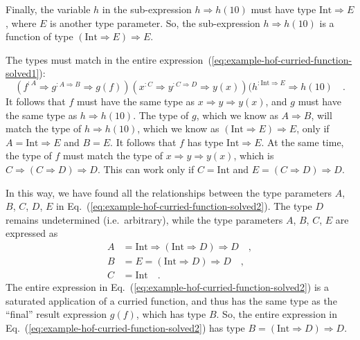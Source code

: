 Finally, the variable $h$ in the sub-expression $h\Rightarrow h(10)$
must have type $\text{Int}\Rightarrow E$, where $E$ is another type
parameter. So, the sub-expression $h\Rightarrow h(10)$ is a function
of type $\left(\text{Int}\Rightarrow E\right)\Rightarrow E$.

The types must match in the entire expression~(\ref{eq:example-hof-curried-function-solved1}):
\begin{equation}
(f^{:A}\Rightarrow g^{:A\Rightarrow B}\Rightarrow g(f))(x^{:C}\Rightarrow y^{:C\Rightarrow D}\Rightarrow y(x))(h^{:\text{Int}\Rightarrow E}\Rightarrow h(10)\quad.\label{eq:example-hof-curried-function-solved2}
\end{equation}
It follows that $f$ must have the same type as $x\Rightarrow y\Rightarrow y(x)$,
and $g$ must have the same type as $h\Rightarrow h(10)$. The type
of $g$, which we know as $A\Rightarrow B$, will match the type of
$h\Rightarrow h(10)$, which we know as $\left(\text{Int}\Rightarrow E\right)\Rightarrow E$,
only if $A=\text{Int}\Rightarrow E$ and $B=E$. It follows that $f$
has type $\text{Int}\Rightarrow E$. At the same time, the type of
$f$ must match the type of $x\Rightarrow y\Rightarrow y(x)$, which
is $C\Rightarrow(C\Rightarrow D)\Rightarrow D$. This can work only
if $C=\text{Int}$ and $E=(C\Rightarrow D)\Rightarrow D$.

In this way, we have found all the relationships between the type
parameters $A$, $B$, $C$, $D$, $E$ in Eq.~(\ref{eq:example-hof-curried-function-solved2}).
The type $D$ remains undetermined (i.e.~arbitrary), while the type
parameters $A$, $B$, $C$, $E$ are expressed as
\begin{align}
A & =\text{Int}\Rightarrow\left(\text{Int}\Rightarrow D\right)\Rightarrow D\quad,\label{eq:example-hof-curried-solved3}\\
B & =E=\left(\text{Int}\Rightarrow D\right)\Rightarrow D\quad,\label{eq:example-hof-curried-solved4}\\
C & =\text{Int}\quad.\nonumber 
\end{align}
The entire expression in Eq.~(\ref{eq:example-hof-curried-function-solved2})
is a saturated application of a curried function, and thus has the
same type as the ``final'' result expression $g(f)$, which has
type $B$. So, the entire expression in Eq.~(\ref{eq:example-hof-curried-function-solved2})
has type $B=\left(\text{Int}\Rightarrow D\right)\Rightarrow D$.

